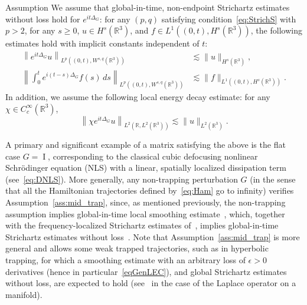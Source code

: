 \documentclass[10pt]{amsart}
\theoremstyle{definition}\newtheorem{defi}[theo]{Definition}\newtheorem{rema}[theo]{Remark}\newtheorem{exam}[theo]{Example}\newtheorem{exem}[theo]{Example}\newtheorem{nota}[theo]{Notation}
\newcommand*\R{\mathbb{R}}
\DeclareMathOperator{\I}{I}
\begin{document}
\begin{enonce}{Assumption} \label{ass:mid_trap}
We assume that global-in-time, non-endpoint Strichartz estimates without loss hold for $e^{it\Delta_G}$: for any $(p, q)$ satisfying condition~\eqref{eq:StrichS} with $p>2$, for any $s \geq 0$, $u \in H^s(\R^3)$, and $f \in L^1((0,t), H^s(\R^3))$, the following estimates hold with implicit constants independent of $t$:
\begin{align}
\left\| e^{it\Delta_G} u \right\|_{L^p\left((0,t), W^{s,q}(\R^3)\right)} &\lesssim \| u \|_{H^s(\R^3)},\label{eqStrichR31}
\\
\left\| \int_0^t e^{i(t-s)\Delta_G} f(s) \, ds \right\|_{L^p((0,t), W^{s,q}(\R^3))} &\lesssim \| f \|_{L^1\left((0,t),H^s(\R^3)\right)}.\label{eqStrichR32}
\end{align}
In addition, we assume the following local energy decay estimate: for any $\chi \in C^\infty_c(\R^3)$,
\begin{equation}\label{eqGenLEC}
\left\| \chi e^{it\Delta_G} u \right\|_{L^2(\R, L^2(\R ^3))} \lesssim \| u \|_{L^2(\R^3)}.
\end{equation}
\end{enonce}

A primary and significant example of a matrix satisfying the above is the flat case $G = \I$, corresponding to the classical cubic defocusing nonlinear Schr{\"o}dinger equation (NLS) with a linear, spatially localized dissipation term (see~\eqref{eq:DNLS}). More generally, any non-trapping perturbation $G$ (in the sense that all the Hamiltonian trajectories defined by~\eqref{eq:Ham} go to infinity) verifies Assumption~\ref{ass:mid_trap}, since, as mentioned previously, the non-trapping assumption implies global-in-time local smoothing estimate~\cite{BuGeTz04b}, which, together with the frequency-localized Strichartz estimates of~\cite{BuGeTz04}, implies global-in-time Strichartz estimates without loss~\cite{Iv10, StTa02}. Note that Assumption~\ref{ass:mid_trap} is more general and allows some weak trapped trajectories, such as in hyperbolic trapping, for which a smoothing estimate with an arbitrary loss of $\epsilon>0$ derivatives (hence in particular~\eqref{eqGenLEC}), and global Strichartz estimates without loss, are expected to hold (see~\cite{BuGuHa10} in the case of the Laplace operator on a manifold).
\end{document}
